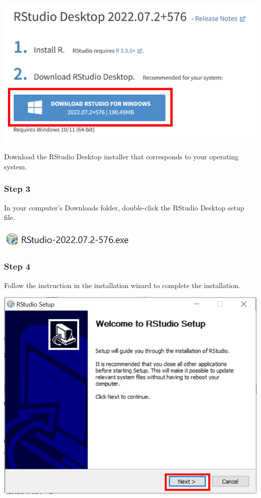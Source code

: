 \documentclass[
  letterpaper,
  DIV=11,
  numbers=noendperiod]{scrreprt}
\begin{document}
\includegraphics{./images/paste-027BCBD8.png}

Download the RStudio Desktop installer that corresponds to your
operating system.

\hypertarget{step-3-2}{%
\subsubsection{Step 3}\label{step-3-2}}

In your computer's Downloads folder, double-click the RStudio Desktop
setup file.

\includegraphics{./images/paste-31A16011.png}

\hypertarget{step-4-1}{%
\subsubsection{Step 4}\label{step-4-1}}

Follow the instruction in the installation wizard to complete the
installation.

\includegraphics{./images/paste-427EA827.png}
\end{document}
